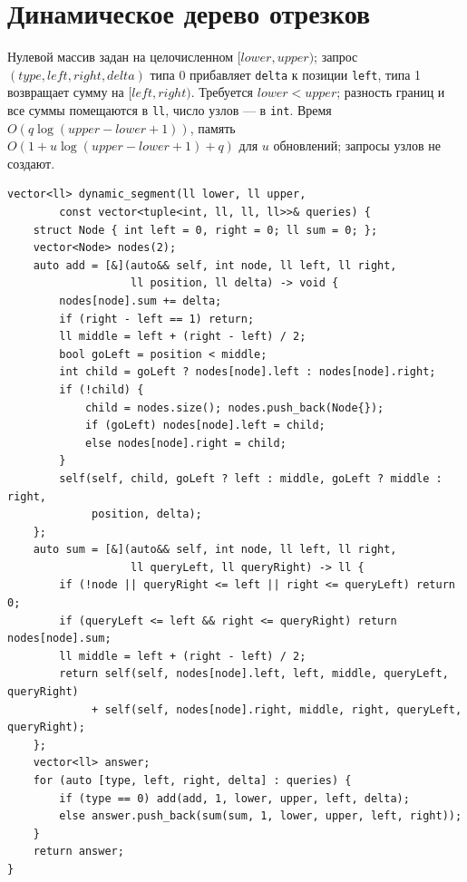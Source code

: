 \section{Динамическое дерево отрезков}
Нулевой массив задан на целочисленном $[lower,upper)$; запрос $(type,left,right,delta)$ типа 0 прибавляет \texttt{delta} к позиции \texttt{left}, типа 1 возвращает сумму на $[left,right)$.
Требуется $lower<upper$; разность границ и все суммы помещаются в \texttt{ll}, число узлов --- в \texttt{int}.
Время $O(q\log(upper-lower+1))$, память $O(1+u\log(upper-lower+1)+q)$ для $u$ обновлений; запросы узлов не создают.
\begin{lstlisting}[name=dynamic_segment]
vector<ll> dynamic_segment(ll lower, ll upper,
        const vector<tuple<int, ll, ll, ll>>& queries) {
    struct Node { int left = 0, right = 0; ll sum = 0; };
    vector<Node> nodes(2);
    auto add = [&](auto&& self, int node, ll left, ll right,
                   ll position, ll delta) -> void {
        nodes[node].sum += delta;
        if (right - left == 1) return;
        ll middle = left + (right - left) / 2;
        bool goLeft = position < middle;
        int child = goLeft ? nodes[node].left : nodes[node].right;
        if (!child) {
            child = nodes.size(); nodes.push_back(Node{});
            if (goLeft) nodes[node].left = child;
            else nodes[node].right = child;
        }
        self(self, child, goLeft ? left : middle, goLeft ? middle : right,
             position, delta);
    };
    auto sum = [&](auto&& self, int node, ll left, ll right,
                   ll queryLeft, ll queryRight) -> ll {
        if (!node || queryRight <= left || right <= queryLeft) return 0;
        if (queryLeft <= left && right <= queryRight) return nodes[node].sum;
        ll middle = left + (right - left) / 2;
        return self(self, nodes[node].left, left, middle, queryLeft, queryRight)
             + self(self, nodes[node].right, middle, right, queryLeft, queryRight);
    };
    vector<ll> answer;
    for (auto [type, left, right, delta] : queries) {
        if (type == 0) add(add, 1, lower, upper, left, delta);
        else answer.push_back(sum(sum, 1, lower, upper, left, right));
    }
    return answer;
}
\end{lstlisting}
%

